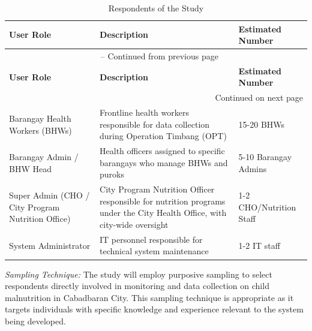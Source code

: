 \documentclass[12pt, a4paper]{report}
\begin{document}
\vspace{0.3cm}
\begin{longtable}{p{3.5cm} p{7cm} p{3cm}}
    \caption{Respondents of the Study} \label{tab:respondents} \\
    \toprule
    \textbf{User Role} & \textbf{Description} & \textbf{Estimated Number} \\
    \midrule
    \endfirsthead
    \multicolumn{3}{c}{{\tablename\ \thetable{} -- Continued from previous page}} \\
    \toprule
    \textbf{User Role} & \textbf{Description} & \textbf{Estimated Number} \\
    \midrule
    \endhead
    \midrule
    \multicolumn{3}{r}{{Continued on next page}} \\
    \endfoot
    \bottomrule
    \endlastfoot
    Barangay Health Workers (BHWs) & Frontline health workers responsible for data collection during Operation Timbang (OPT) & 15-20 BHWs \\
    \addlinespace
    Barangay Admin / BHW Head & Health officers assigned to specific barangays who manage BHWs and puroks & 5-10 Barangay Admins \\
    \addlinespace
    Super Admin (CHO / City Program Nutrition Office) & City Program Nutrition Officer responsible for nutrition programs under the City Health Office, with city-wide oversight & 1-2 CHO/Nutrition Staff \\
    \addlinespace
    System Administrator & IT personnel responsible for technical system maintenance & 1-2 IT staff \\
\end{longtable}
\vspace{0.3cm}

\textit{Sampling Technique:} The study will employ purposive sampling to select respondents directly involved in monitoring and data collection on child malnutrition in Cabadbaran City. This sampling technique is appropriate as it targets individuals with specific knowledge and experience relevant to the system being developed.
\end{document}
